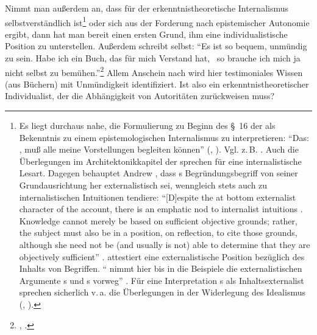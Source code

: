 Nimmt man außerdem an, dass für  der erkenntnistheoretische
Internalismus selbstverständlich ist\footnote{Es liegt durchaus nahe, die Formulierung zu
Beginn des \S~16 der  als Bekenntnis zu einem
epistemologischen Internalismus zu interpretieren:
\enquote{Das: , muß alle meine Vorstellungen begleiten können}
\mkbibparens{\cite[][\S~16]{Kant:KritikderreinenVernunft2003},
\cite[][III: 108.19]{Kant:GesammelteWerke1900ff.}}. Vgl. z.\,B.
\cite[][73]{Schulting:KantNon-ConceptualContentandtheenquoteSecondStepoftheB-Deduction2012}.
Auch die Überlegungen im Architektonikkapitel der  sprechen für eine internalistische Lesart. Dagegen behauptet Andrew
, dass s Begründungsbegriff von
seiner Grundausrichtung her externalistisch sei, wenngleich 
stets auch zu internalistischen Intuitionen tendiere:
\enquote{[D]espite the at bottom externalist character of the account, there is
an emphatic nod to internalist intuitions \punkt . Knowledge cannot merely be
based on sufficient objective grounds; rather, the subject must also be in a
position, on reflection, to cite those grounds, although she need not be (and
usually is not) able to determine that they are  objectively sufficient}
\parencite[][\pno~49\,f.]{Chignell:KantsConceptsofJustification2007}.
attestiert  eine externalistische Position
bezüglich des Inhalts von Begriffen.
\enquote{ nimmt hier bis in die Beispiele die
externalistischen Argumente s und
s vorweg}
\parencite[][548]{Willaschek:DertranszendentaleIdealismusunddieIdealitaetvonRaumundZeit1997}.
Für eine Interpretation s als Inhaltsexternalist sprechen
sicherlich v.\,a. die Überlegungen in der Widerlegung des Idealismus
\mkbibparens{\cite[siehe][B 274--279]{Kant:KritikderreinenVernunft2003},
\cite[][III: 190.24--193.24]{Kant:GesammelteWerke1900ff.}}.} oder sich aus der
Forderung nach epistemischer Autonomie ergibt, dann hat man bereit einen ersten Grund, ihm eine individualistische Position zu unterstellen.
Außerdem schreibt  selbst: \enquote{Es ist so bequem,
unmündig zu sein. Habe ich ein Buch, das für mich Verstand hat, \punkt\ so
brauche ich mich ja nicht selbst zu
bemühen.}\footnote{\cite[][A~482]{Kant:BeantwortungderFrage:WasistAufklaerung?1977},
\cite[][VIII: 35.13--16]{Kant:GesammelteWerke1900ff.}.} Allem Anschein nach wird
hier testimoniales Wissen (aus Büchern) mit Unmündigkeit identifiziert. Ist
 also ein erkenntnistheoretischer Individualist, der die
Abhängigkeit von Autoritäten zurückweisen
muss?\label{Absatz:AufklaerungundZugangsInternalismus-ENDE}

